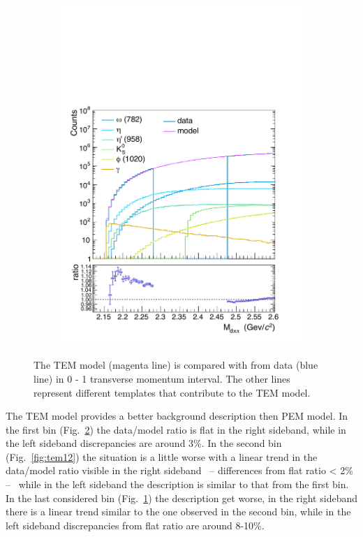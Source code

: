 \begin{figure}
\begin{subfigure}{.33\textwidth}
  \includegraphics[width=\linewidth]{gfx/can2}
  \caption{}
  \label{fig:tem23}
\end{subfigure}
\caption{The TEM model (magenta line) is compared with \minv from data (blue line) in 0 - 1 \gevc transverse momentum interval. The other lines represent different templates that contribute to the TEM model.}
\label{fig:tem01}
\end{figure}

The TEM model provides a better background description then PEM model. In the first \pt bin
(Fig.~\ref{fig:tem01}) the data/model ratio is flat in the right sideband, while in the left sideband 
discrepancies are around 3\%. In the second bin (Fig.~\ref{fig:tem12}) the situation is a little worse
with a linear trend in the data/model ratio visible in the right sideband \ -- differences from flat
ratio < 2\% -- \ while in the left sideband the description is similar to that from the first bin. 
In the last considered bin (Fig.~\ref{fig:tem23}) the description get worse, in the right sideband
there is a linear trend similar to the one observed in the second bin, while in the left sideband 
discrepancies from flat ratio are around 8-10\%.

